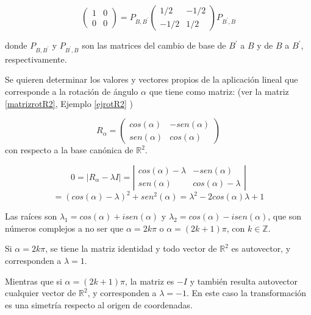 \begin{example}
\bigskip

$$\left(\begin{array}{cc}  1 & 0  \\ 0 &  0
\end{array}
 \right)=  P _{B,B^{\prime}} \left(\begin{array}{cc}  1/2 & -1/2  \\ -1/2 &  1/2
\end{array}
 \right)P _{B^{\prime},B}$$
 
\bigskip
 
\noindent
 donde $P _{B,B^{\prime}}$ y $P _{B^{\prime},B}$ son las matrices del cambio de base de $B^{\prime}$ a $B$ y de $B$ a 
 $B^{\prime}$, respectivamente.
  \end{example}
  
 \bigskip
 
\begin{example}
\label{rotautov}


Se quieren determinar los valores y vectores propios de la aplicación lineal que corresponde a la rotación de ángulo $\alpha$ que tiene como matriz: (ver la matriz \ref{matrizrotR2}, Ejemplo  \ref{ejrotR2} )

\bigskip



$$R_\alpha=\left(\begin{array}{cc}  cos(\alpha) &-sen(\alpha)  \\ sen(\alpha) & cos(\alpha)
\end{array}
 \right)$$
\noindent
con respecto a la base canónica de $\mathbb{R}^2$.



\[
0= 
\left   | R_\alpha -   \lambda I \right  | = \left|\begin{array}{cc}
 cos(\alpha)-\lambda  & -sen(\alpha) \\
sen(\alpha) &  cos(\alpha)- \lambda 
\end{array}
\right| \]
\[=(cos(\alpha)- \lambda)^2+ sen^2(\alpha)= \lambda^2 - 2 cos(\alpha )\lambda +1
\]

\bigskip

Las raíces son $\lambda_1= cos(\alpha) + i sen(\alpha)$ y $\lambda_2= cos(\alpha) - i sen(\alpha)$, que son números complejos a no ser que $ \alpha = 2k \pi $ o $ \alpha = (2k+1) \pi $, con $k \in \mathbb{Z}$.

\bigskip

Si $ \alpha = 2k \pi $, se tiene la matriz identidad  y todo vector de $\mathbb{R}^2$ es autovector, y corresponden a $ \lambda=1$. 

\bigskip

Mientras que si $ \alpha = (2k+1) \pi $, la matriz es $-I$ y también resulta autovector cualquier vector de $\mathbb{R}^2$, y corresponden a $ \lambda=-1$. En este caso la transformación es una simetría respecto al origen de coordenadas.
\end{example}

